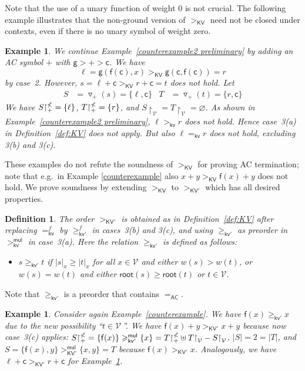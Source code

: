 \documentclass{tlp}
\newtheorem{definition}[theorem]{Definition}
\newtheorem{example}[theorem]{Example}
\newcommand{\tf}[1]{{\triangledown_{\!#1}}}
\newcommand{\m}[1]{\mathsf{#1}}
\newcommand{\mc}[1]{\mathcal{#1}}
\newcommand{\mr}[1]{\mathrm{#1}}
\newcommand{\rt}{\m{root}}
\newcommand{\Wt}{\m{w,root}}
\renewcommand{\Wt}{\m{kv}}
\newcommand{\kvc}{{\m{kv'}}}
\newcommand{\mul}{\m{mul}}
\newcommand{\VV}{\mc{V}}
\newcommand{\AC}{\mr{\m{AC}}}
\newcommand{\KV}{\mr{\m{KV}}}
\newcommand{\KVC}{\mr{\m{KV'}}}
\newcommand{\rrs}[3][f]{{#2}{\restriction}^{\smash{#3}}_{#1}}
\begin{document}
Note that the use of a unary function of weight 0 is not crucial.
The following example illustrates that
the non-ground version of $>_\KV$ need not be closed under
contexts, even if there is no unary symbol of weight zero.

\begin{example}
\label{counterexample 2}
We continue Example~\ref{counterexample2 preliminary}
by adding an AC symbol $+$ with $\m{g} > + > \m{c}$. We have
\[
\ell = \m{g}(\m{f}(\m{c}),x) >_\KV \m{g}(\m{c},\m{f}(\m{c})) = r
\]
by case~2. However,
$s = \ell + \m{c} >_\KV r + \m{c} = t$ does not hold.
Let
\begin{align*}
S &= \tf{+}(s) = \{ \ell, \m{c} \} &
T &= \tf{+}(t) = \{ r, \m{c} \}
\end{align*}
We have
$\rrs[+]{S}{\nless} = \{ \ell \}$, $\rrs[+]{T}{\nless} = \{ r \}$, and
$S{\restriction}_\VV = T{\restriction}_\VV = \varnothing$.
As shown in Example~\ref{counterexample2 preliminary},
$\ell >_\Wt r$ does not hold.
Hence case~3(a) in Definition~\ref{def:KV} does not apply.
But also $\ell =_\Wt r$ does not hold, excluding
3(b) and 3(c).
\end{example}

These examples do not refute the soundness of $>_\KV$ for proving AC
termination; note that e.g.\ in Example \ref{counterexample}
also $x + y >_\KV \m{f}(x) + y$ does not hold. We prove soundness by
extending $>_\KV$ to $>_\KVC$ which has all desired properties.



\begin{definition}
\label{def:KV'}
The order $>_\KVC$ is obtained as in Definition~\ref{def:KV} after
replacing
$=_\Wt^f$ by $\geqslant_\kvc^f$ in cases~3(b) and 3(c),
and using $\geqslant_\kvc$ as preorder in $>_\Wt^\mul$ in case~3(a).
Here the relation $\geqslant_\kvc$ is defined as follows:
\begin{itemize}
\item
$s \geqslant_\kvc t$ if $|s|_x \geqslant |t|_x$ for all $x \in \VV$
and either $w(s) > w(t)$, or $w(s) = w(t)$ and
either $\rt(s) \geqslant \rt(t)$ or $t \in \VV$.
\end{itemize}
\end{definition}

Note that $\geqslant_\kvc$ is a preorder that contains $=_\AC$.

\begin{example}
Consider again Example~\ref{counterexample}.
We have $\m{f}(x) \geqslant_\kvc x$ due to the new possibility
``$t \in \VV$\,''.
We have
$\m{f}(x) + y >_\KVC x + y$ because now case~3(c) applies:
$\rrs[+]{S}{\nless} = \{ \m{f}(x) \} \geqslant_\kvc^\mul
\{ x \} = \rrs[+]{T}{\nless} \uplus T{\restriction}_\VV -
S{\restriction}_\VV$, $|S| = 2 = |T|$, and
$S = \{ \m{f}(x), y \} >_\KVC^\mul \{ x, y \} = T$ because
$\m{f}(x) >_\KVC x$.
Analogously, we have $\ell + \m{c} >_\KVC r + \m{c}$ for 
Example~\ref{counterexample 2}.
\end{example}
\end{document}
